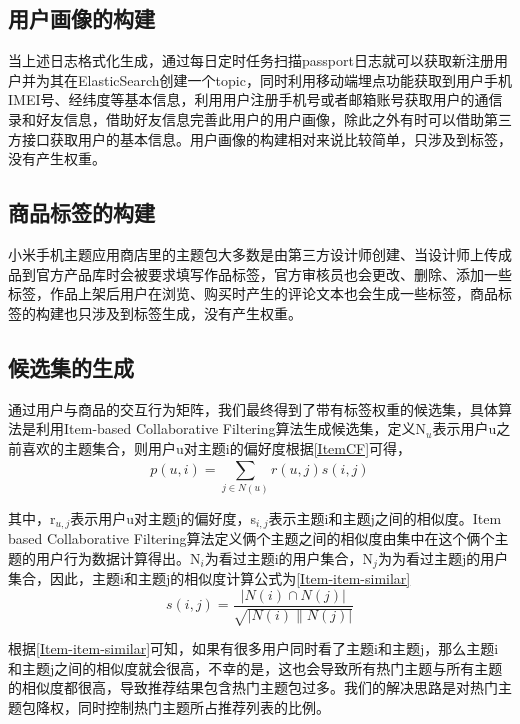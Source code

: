     \subsection{用户画像的构建}
    当上述日志格式化生成，通过每日定时任务扫描passport日志就可以获取新注册用户并为其在ElasticSearch创建一个topic，同时利用移动端埋点功能获取到用户手机IMEI号、经纬度等基本信息，利用用户注册手机号或者邮箱账号获取用户的通信录和好友信息，借助好友信息完善此用户的用户画像，除此之外有时可以借助第三方接口获取用户的基本信息。用户画像的构建相对来说比较简单，只涉及到标签，没有产生权重。

    \subsection{商品标签的构建}
    小米手机主题应用商店里的主题包大多数是由第三方设计师创建、当设计师上传成品到官方产品库时会被要求填写作品标签，官方审核员也会更改、删除、添加一些标签，作品上架后用户在浏览、购买时产生的评论文本也会生成一些标签，商品标签的构建也只涉及到标签生成，没有产生权重。

    \subsection{候选集的生成}
    通过用户与商品的交互行为矩阵，我们最终得到了带有标签权重的候选集，具体算法是利用Item-based Collaborative Filtering算法生成候选集，定义N$_u$表示用户u之前喜欢的主题集合，则用户u对主题i的偏好度根据\autoref{ItemCF}可得，
    \begin{equation}
    p(u,i)=\sum \limits _{j\in N(u)}^{} r(u,j)s(i,j)
    \label{ItemCF}
    \end{equation}

    其中，r$_{u,j}$表示用户u对主题j的偏好度，s$_{i,j}$表示主题i和主题j之间的相似度。Item based Collaborative Filtering算法定义俩个主题之间的相似度由集中在这个俩个主题的用户行为数据计算得出。N$_{i}$为看过主题i的用户集合，N$_{j}$为为看过主题j的用户集合，因此，主题i和主题j的相似度计算公式为\autoref{Item-item-similar}
    \begin{equation}
    s(i,j)=\frac{\left | N(i)\cap N(j) \right |}{\sqrt{\left | N(i) \parallel N(j) \right |}}
    \label{Item-item-similar}
    \end{equation}

    根据\autoref{Item-item-similar}可知，如果有很多用户同时看了主题i和主题j，那么主题i和主题j之间的相似度就会很高，不幸的是，这也会导致所有热门主题与所有主题的相似度都很高，导致推荐结果包含热门主题包过多。我们的解决思路是对热门主题包降权，同时控制热门主题所占推荐列表的比例。

